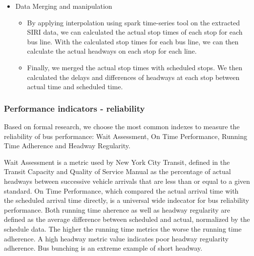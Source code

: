 \documentclass[12pt,journal,compsoc]{IEEEtran}
\begin{document}
\begin{itemize}
\item Data Merging and manipulation

\begin{itemize}
\item By applying interpolation using spark time-series tool on the extracted SIRI data, we can calculated the actual stop times of each stop for each bus line. With the calculated stop times for each bus line, we can then calculate the actual headways on each stop for each line. 
 
\item Finally, we merged the actual stop times with scheduled stops. We then calculated the delays and differences of headways at each stop between actual time and scheduled time.
\end{itemize}

\end{itemize}


\subsubsection{Performance indicators - reliability}

Based on formal research, we choose the most common indexes to measure the reliability of bus performance: Wait Assessment, On Time Performance, Running Time Adherence and Headway Regularity.

Wait Assessment is a metric used by New York City Transit, defined in the Transit Capacity and Quality of Service Manual as the percentage of actual headways between successive vehicle arrivals that are less than or equal to a given standard. On Time Performance, which compared the actual arrival time with the scheduled arrival time directly, is a universal wide indecator for bus reliability performance. Both running time aherence as well as headway regularity are defined as the average difference between scheduled and actual, normalized by the schedule data. The higher the running time metrics the worse the running time adherence. A high headway metric value indicates poor headway regularity adherence. Bus bunching is an extreme example of short headway.
 
\end{document}
